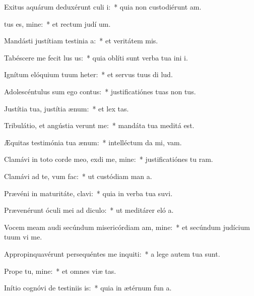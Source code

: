 \item Exitus aquárum deduxérunt culi i:~* quia non custodiérunt  am.
\item {}tus es, mine:~* et rectum judí um.
\item Mandásti justítiam testinia a:~* et veritátem  mis.
\item Tabéscere me fecit lus us:~* quia oblíti sunt verba tua ini i.
\item Ignítum elóquium tuum heter:~* et servus tuus di lud.
\item Adolescéntulus sum ego  contus:~* justificatiónes tuas non  tus.
\item Justítia tua, justítia  ænum:~* et lex  tas.
\item Tribulátio, et angústia verunt me:~* mandáta tua meditá  est.
\item Æquitas testimónia tua  ænum:~* intelléctum da mi,  vam.
\item Clamávi in toto corde meo, exdi me, mine:~* justificatiónes tu ram.
\item Clamávi ad te, vum  fac:~* ut custódiam man a.
\item Prævéni in maturitáte,  clavi:~* quia in verba tua suvi.
\item Prævenérunt óculi mei ad  diculo:~* ut meditárer eló a.
\item Vocem meam audi secúndum misericórdiam am, mine:~* et secúndum judícium tuum vi me.
\item Appropinquavérunt persequéntes me inquiti:~* a lege autem tua   sunt.
\item Prope  tu, mine:~* et omnes viæ  tas.
\item Inítio cognóvi de testiniis is:~* quia in ætérnum fun a.
